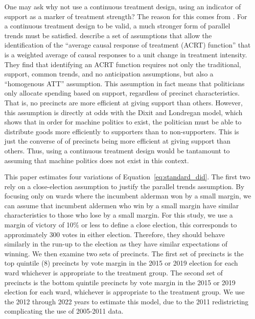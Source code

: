One may ask why not use a continuous treatment design, using an indicator of support as a marker of treatment strength?
The reason for this comes from \cite{callaway2021differenceindifferences_continuous}. 
For a continuous treatment design to be valid, a much stronger form of parallel trends must be satisfied.
\cite{callaway2021differenceindifferences_continuous} describe a set of assumptions that allow the identification of the  ``average causal response of treatment (ACRT) function'' that is a weighted average of causal responses to a unit change in treatment intensity.
They find that identifying an ACRT function requires not only the traditional, support, common trends, and no anticipation assumptions, but also a ``homogenous ATT'' assumption. 
This assumption in fact means that politicians only allocate spending based on support, regardless of precinct characteristics.
That is, no precincts are more efficient at giving support than others.
However, this assumption is directly at odds with the Dixit and Londregan model, which shows that in order for machine politics to exist, the politician must be able to distribute goods more efficiently to supporters than to non-supporters. 
This is just the converse of of precincts being more efficient at giving support than others.
Thus, using a continuous treatment design would be tantamount to assuming that machine politics does not exist in this context. 


This paper estimates four variations of Equation~\ref{eq:standard_did}. 
The first two rely on a close-election assumption to justify the parallel trends assumption. 
By focusing only on wards where the incumbent alderman won by a small margin, we can assume that incumbent aldermen who win by a small margin have similar characteristics to those who lose by a small margin.
For this study, we use a margin of victory of 10\% or less to define a close election, this corresponds to approximately 300 votes in either election.
Therefore, they should behave similarly in the run-up to the election as they have similar expectations of winning.
We then examine two sets of precincts. 
The first set of precincts is the top quintile (8) precincts by vote margin in the 2015 or 2019 election for each ward whichever is appropriate to the treatment group. 
The second set of precincts is the bottom quintile precincts by vote margin in the 2015 or 2019 election for each ward, whichever is appropriate to the treatment group.
We use the 2012 through 2022 years to estimate this model, due to the 2011 redistricting complicating the use of 2005-2011 data. 

